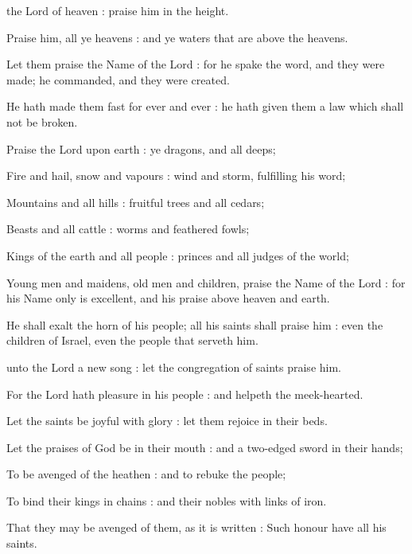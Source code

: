 
 the Lord of heaven : praise him in the height.\par
{}
Praise him, all ye heavens : and ye waters that are above the heavens.\par
{}Let them praise the Name of the Lord : for he spake the word, and they were made; he commanded, and they were created.\par
{}He hath made them fast for ever and ever : he hath given them a law which shall not be broken.\par
{}Praise the Lord upon earth : ye dragons, and all deeps;\par
{}Fire and hail, snow and vapours : wind and storm, fulfilling his word;\par
{}Mountains and all hills : fruitful trees and all cedars;\par
{}Beasts and all cattle : worms and feathered fowls;\par
{}Kings of the earth and all people : princes and all judges of the world;\par
{}Young men and maidens, old men and children, praise the Name of the Lord : for his Name only is excellent, and his praise above heaven and earth.\par
{}He shall exalt the horn of his people; all his saints shall praise him : even the children of Israel, even the people that serveth him.\par


 unto the Lord a new song : let the congregation of saints praise him.\par
{}
For the Lord hath pleasure in his people : and helpeth the meek-hearted.\par
{}Let the saints be joyful with glory : let them rejoice in their beds.\par
{}Let the praises of God be in their mouth : and a two-edged sword in their hands;\par
{}To be avenged of the heathen : and to rebuke the people;\par
{}To bind their kings in chains : and their nobles with links of iron.\par
{}That they may be avenged of them, as it is written : Such honour have all his saints.\par

